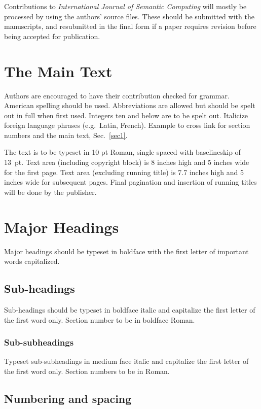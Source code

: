 \documentclass{ws-ijsc}
\begin{document}
Contributions to {\it International Journal of 
Semantic Computing} will mostly be processed by
using the authors' source files. These should be submitted with
the manuscripts, and resubmitted in the final form if a paper requires
revision before being accepted for publication.

\section{The Main Text \label{sec1}}
Authors are encouraged to have their contribution checked for grammar. 
American spelling should be used. Abbreviations are
allowed but should be spelt out in full when first used. Integers ten
and below are to be spelt out. Italicize foreign language phrases
(e.g.~Latin, French). Example to cross link for section numbers and 
the main text, Sec.~\ref{sec1}.

The text is to be typeset in 10 pt Roman, single spaced with
baselineskip of 13~pt. Text area (including copyright block) is 
8 inches high and 5 inches wide for the first page.  Text area
(excluding running title) is 7.7 inches high and 5 inches wide for
subsequent pages.  Final pagination and insertion of running titles
will be done by the publisher.

\section{Major Headings}

Major headings should be typeset in boldface with the first letter of
important words capitalized.

\subsection{Sub-headings}

Sub-headings should be typeset in boldface italic and capitalize
the first letter of the first word only. Section number to be in
boldface Roman.

\subsubsection{Sub-subheadings}

Typeset sub-subheadings in medium face italic and capitalize the first
letter of the first word only. Section numbers to be in Roman.

\subsection{Numbering and spacing}
\end{document}
